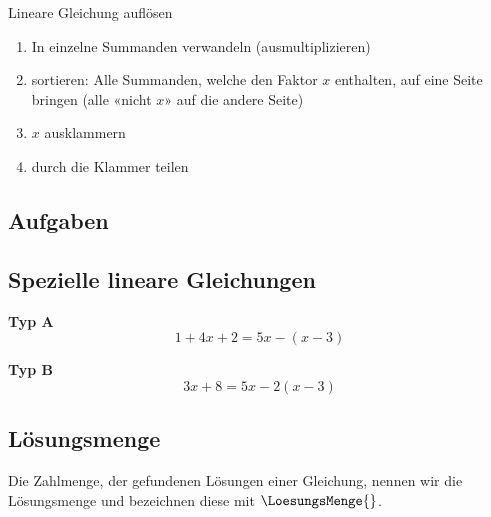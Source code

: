 \begin{rezept}{Lineare Gleichung auflösen}{}
  \begin{enumerate}
    \item In einzelne Summanden verwandeln (ausmultiplizieren)
  \item sortieren: Alle Summanden, welche den Faktor $x$ enthalten, auf eine Seite bringen (alle «nicht $x$» auf die andere Seite)
  \item $x$ ausklammern
  \item durch die Klammer teilen
    \end{enumerate} 
  \end{rezept}


\subsection*{Aufgaben}




\newpage

\subsection{Spezielle lineare Gleichungen}
\textbf{Typ A}\\

$$1+4x+2 = 5x - (x-3)$$

\textbf{Typ B}\\

$$3x+8 = 5x-2(x-3)$$


\subsection{Lösungsmenge}
  Die Zahlmenge, der gefundenen Lösungen einer Gleichung, nennen wir
  die Lösungsmenge und bezeichnen diese mit $\LoesungsMenge{}$.

